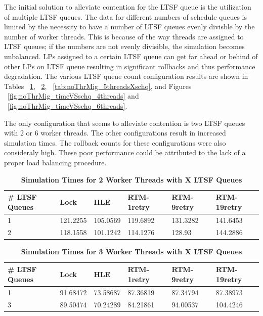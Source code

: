 \documentclass[11pt]{book}
\begin{document}
The initial solution to alleviate contention for the LTSF queue is the
utilization of multiple LTSF queues.  The data for different numbers of schedule
queues is limited by the necessity to have a number of LTSF queues evenly
divisble by the number of worker threads.  This is because of the way threads
are assigned to LTSF queues; if the numbers are not evenly divisible, the
simulation becomes unbalanced.  LPs assigned to a certain LTSF queue can get far
ahead or behind of other LPs on LTSF queue resulting in significant rollbacks
and thus performance degradation.  The various LTSF queue count configuration
results are shown in Tables ~\ref{tab:noThrMig_2threadsXschq},
~\ref{tab:noThrMig_3threadsXschq}, ~\ref{tab:noThrMig_5threadsXschq}, and Figures
~\ref{fig:noThrMig_timeVSschq_4threads} and
~\ref{fig:noThrMig_timeVSschq_6threads}.

The only configuration that seems to alleviate contention is two LTSF queues
with 2 or 6 worker threads.  The other configurations result in increased
simulation times.  The rollback counts for these configurations were also
consideraly high.  These poor performance could be attributed to the lack of a
proper load balancing procedure.\par

\begin{table}[H]
    \centering
    \begin{tabular}{l|p{2cm}|p{2cm}|p{2cm}|p{2cm}|p{2cm}}
        \textbf{\# LTSF Queues}&Lock &HLE &RTM-1retry &RTM-9retry &RTM-19retry \\
        \hline
        \midrule
            1 &121.2255  &105.0569 &119.6892 &131.3282 &141.6453 \\ 
            2 &118.1558  &101.1242 &114.1276 &128.93   &144.2886 \\
    \end{tabular}
    \caption{\textbf{Simulation Times for 2 Worker Threads with X LTSF Queues}}
    \label{tab:noThrMig_2threadsXschq}
\end{table}

\begin{table}[H]
    \centering
    \begin{tabular}{l|p{2cm}|p{2cm}|p{2cm}|p{2cm}|p{2cm}}
        \textbf{\# LTSF Queues}&Lock &HLE &RTM-1retry &RTM-9retry &RTM-19retry \\
        \hline
        \midrule
            1 &91.68472 &73.58687 &87.36819 &87.34794 &87.38973 \\ 
            3 &89.50474 &70.24289 &84.21861 &94.00537 &104.4246 \\
    \end{tabular}
    \caption{\textbf{Simulation Times for 3 Worker Threads with X LTSF Queues}}
    \label{tab:noThrMig_3threadsXschq}
\end{table}
\end{document}
